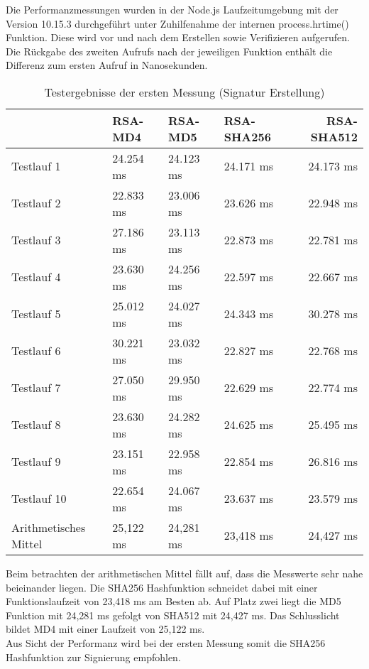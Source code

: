 Die Performanzmessungen wurden in der Node.js Laufzeitumgebung mit der Version 10.15.3 durchgeführt unter Zuhilfenahme der internen process.hrtime() Funktion. Diese wird vor und nach dem Erstellen sowie Verifizieren aufgerufen. Die Rückgabe des zweiten Aufrufs nach der jeweiligen Funktion enthält die Differenz zum ersten Aufruf in Nanosekunden.
\begin{table}[H]
	\begin{tabularx}{\textwidth}{p{}|X|X|X|r}
		& RSA-MD4 & RSA-MD5 & RSA-SHA256 & RSA-SHA512\\
		\hline
		Testlauf 1& 24.254 ms& 24.123 ms& 24.171 ms& 24.173 ms\\
		Testlauf 2& 22.833 ms& 23.006 ms& 23.626 ms& 22.948 ms\\
		Testlauf 3& 27.186 ms& 23.113 ms& 22.873 ms& 22.781 ms\\
		Testlauf 4& 23.630 ms& 24.256 ms& 22.597 ms& 22.667 ms\\
		Testlauf 5& 25.012 ms& 24.027 ms& 24.343 ms& 30.278 ms\\
		Testlauf 6& 30.221 ms& 23.032 ms& 22.827 ms& 22.768 ms\\
		Testlauf 7& 27.050 ms& 29.950 ms& 22.629 ms& 22.774 ms\\
		Testlauf 8& 23.630 ms& 24.282 ms& 24.625 ms& 25.495 ms\\
		Testlauf 9& 23.151 ms& 22.958 ms& 22.854 ms& 26.816 ms\\
		Testlauf 10& 22.654 ms& 24.067 ms& 23.637 ms& 23.579 ms\\
		\hline
		Arithmetisches Mittel& 25,122 ms& 24,281 ms& 23,418 ms& 24,427 ms\\
	\end{tabularx}
	\caption{Testergebnisse der ersten Messung (Signatur Erstellung)}
\end{table}
Beim betrachten der arithmetischen Mittel fällt auf, dass die Messwerte sehr nahe beieinander liegen. Die SHA256 Hashfunktion schneidet dabei mit einer Funktionslaufzeit von 23,418 ms am Besten ab. Auf Platz zwei liegt die MD5 Funktion mit 24,281 ms gefolgt von SHA512 mit 24,427 ms. Das Schlusslicht bildet MD4 mit einer Laufzeit von 25,122 ms.\\
Aus Sicht der Performanz wird bei der ersten Messung somit die SHA256 Hashfunktion zur Signierung empfohlen.
